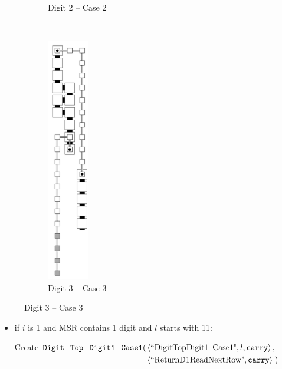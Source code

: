 \begin{itemize}
\begin{figure}[H]
\begin{subfigure}[t]{0.2\textwidth}
                    \caption{\label{fig:warping/digit_top_case2_digit2_msr} Digit 2 -- Case 2}
                \end{subfigure}%
                ~
                \begin{subfigure}[t]{0.2\textwidth}
                    \centering
                    \includegraphics[width=0.2\textwidth]{warping/digit_top_general}
                    \caption{\label{fig:warping/digit_top_general} Digit 3 -- Case 3}
                \end{subfigure}%
            \end{figure}


            \begin{itemize}
                \item if $i$ is 1 and MSR contains 1 digit and $l$ starts with 11:

                Create
                $\begin{aligned}[t]
                    {\tt Digit\_Top\_Digit1\_Case1}(& \left \langle \text{``DigitTopDigit1--Case1"}, l, {\tt carry} \right\rangle, & \\
                                     & \left \langle \text{``ReturnD1ReadNextRow"},      {\tt carry} \right\rangle \;)
                \end{aligned}$
                \vspace{.5cm}



\end{itemize}
\end{itemize}

